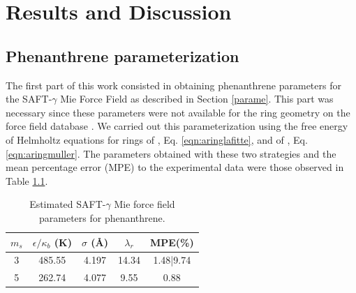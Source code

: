 \chapter{Results and Discussion} %

\label{Chapter5} %

\section{Phenanthrene parameterization}

The first part of this work consisted in obtaining phenanthrene parameters for the SAFT-$\gamma$ Mie Force Field as described in Section \ref{parame}. This part was necessary since these parameters were not available for the ring geometry on the force field database \cite{ervik2016}. We carried out this parameterization using the free energy of Helmholtz equations for rings of \cite{lafitte2012}, Eq. \ref{eqn:aringlafitte}, and of \cite{muller2017}, Eq. \ref{eqn:aringmuller}. The parameters obtained with these two strategies and the mean percentage error (MPE) to the experimental data \cite{pvphen,osborn} were those observed in Table \ref{tbl:estimparameters}.

\begin{table}[h]
	\centering
	\caption{Estimated SAFT-$\gamma$ Mie force field parameters for phenanthrene.}
	\label{tbl:estimparameters}
	\begin{tabular}{ccccc}
		\hline\hline
		$m_s$                & $\epsilon/\kappa_{b}$ (K) & $\sigma$ (\AA) & $\lambda_r$ & MPE(\%)   \\ \hline\hline
		3 \cite{lafitte2012} & 485.55               & 4.197              & 14.34       & 1.48|9.74 \\
		5  \cite{muller2017} & 262.74               & 4.077              & 9.55        & 0.88      \\ \hline\hline
	\end{tabular}
	
\end{table} 

